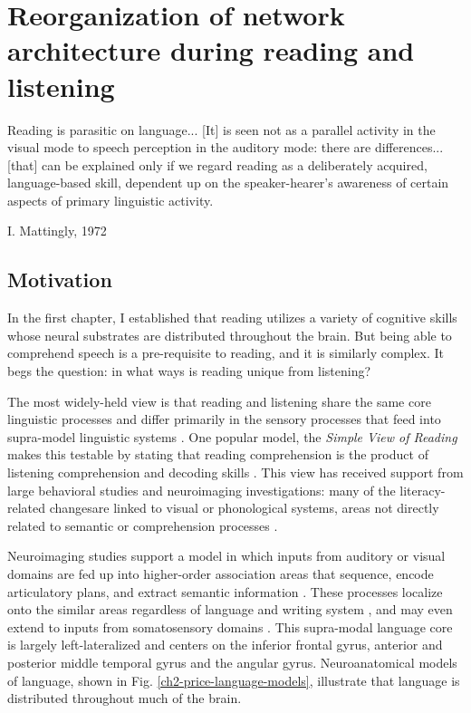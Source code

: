 \chapter{Reorganization of network architecture during reading and listening}

\epigraph{Reading is parasitic on language... [It] is seen not as a parallel activity in the visual mode to speech perception in the auditory mode: there are differences... [that] can be explained only if we regard reading as a deliberately acquired, language-based skill, dependent up on the speaker-hearer's awareness of certain aspects of primary linguistic activity.}{I. Mattingly, 1972 \cite{Mattingly1972}}

\section{Motivation}

In the first chapter, I established that reading utilizes a variety of cognitive skills whose neural substrates are distributed throughout the brain. But being able to comprehend speech is a pre-requisite to reading, and it is similarly complex. It begs the question: in what ways is reading unique from listening?

The most widely-held view is that reading and listening share the same core linguistic processes and differ primarily in the sensory processes that feed into supra-model linguistic systems \cite{Mattingly1972, Price2012}. One popular model, the \textit{Simple View of Reading} makes this testable by stating that reading comprehension is the product of listening comprehension and decoding skills \cite{Gough1988}. This view has received support from large behavioral studies \cite{...} and neuroimaging investigations: many of the literacy-related changesare linked to visual or phonological systems, areas not directly related to semantic or comprehension processes \cite{Schlaggar2006, Dahaene2015}. 

Neuroimaging studies support a model in which inputs from auditory or visual domains are fed up into higher-order association areas that sequence, encode articulatory plans, and extract semantic information \cite{Price2012}. These processes localize onto the similar areas regardless of language and writing system \cite{Rueckl2016}, and may even extend to inputs from somatosensory domains \cite{Xu2005, Sood2015}. This supra-modal language core is largely left-lateralized and centers on the inferior frontal gyrus, anterior and posterior middle temporal gyrus and the angular gyrus. Neuroanatomical models of language, shown in Fig. \ref{ch2-price-language-models}, illustrate that language is distributed throughout much of the brain. 

